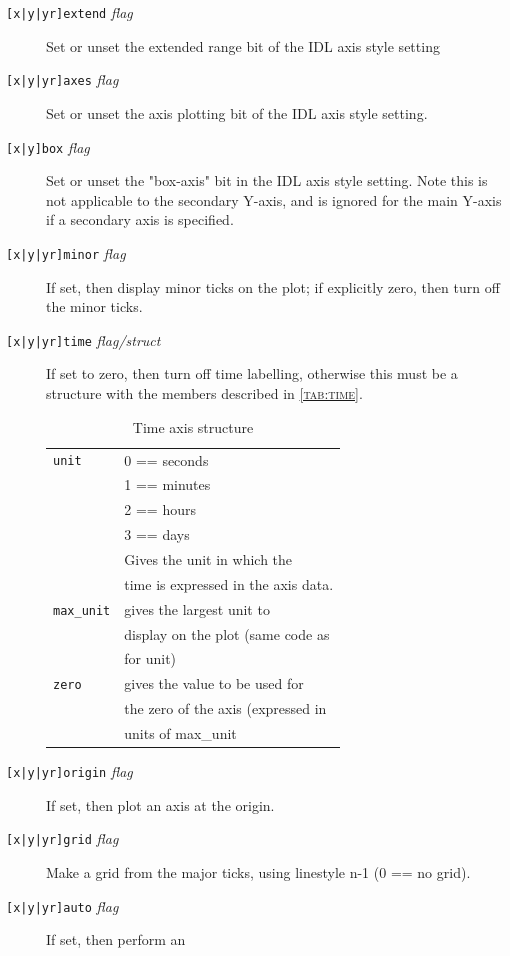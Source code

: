 \documentclass[11pt,twoside,english]{article}
\begin{document}
\begin{description}
\item[\texttt{{[x|y|yr]}extend} \textit{flag}] Set or unset the
  extended range bit of the IDL axis style setting
\item[\texttt{{[x|y|yr]}axes} \textit{flag}] Set or unset the axis
  plotting bit of the IDL axis style setting.
\item[\texttt{{[x|y]}box} \textit{flag}] Set or unset the "box-axis"
  bit in the IDL axis style setting. Note this is not applicable to the
  secondary Y-axis, and is ignored for the main Y-axis if a secondary
  axis is specified.
\item[\texttt{{[x|y|yr]}minor} \textit{flag}] If set, then display
  minor ticks on the plot; if explicitly zero, then turn off the minor
  ticks.
\item[\texttt{{[x|y|yr]}time} \textit{flag/struct}] If set to zero,
  then turn off time labelling, otherwise this must be a structure with
  the members described in \textsc{\autoref{tab:time}}.
  \begin{table}[htbp]
    \centering
    \begin{tabular}{|l|l|}
      \hline
      \texttt{unit}&  0 == seconds\\
      & 1 == minutes\\
      & 2 == hours\\
      & 3 == days\\
      &  Gives the unit in which the\\
      & time is expressed in the axis data.\\
      \hline
      \texttt{max\_unit}& gives the largest unit to\\
      &   display on the plot (same code as\\
      &  for unit)\\
      \hline
      \texttt{zero} & gives the value to be used for \\
      &  the zero of the axis (expressed in\\
      & units of  max\_unit\\
      \hline
    \end{tabular}
    \caption{Time axis structure}
    \label{tab:time}
  \end{table}
\item[\texttt{{[x|y|yr]}origin} \textit{flag}] If set, then plot an
  axis at the origin.
\item[\texttt{{[x|y|yr]}grid} \textit{flag}] Make a grid from the major
  ticks, using linestyle n-1 (0 == no grid).
\item[\texttt{{[x|y|yr]}auto} \textit{flag}] If set, then perform an

\end{description}
\end{document}
